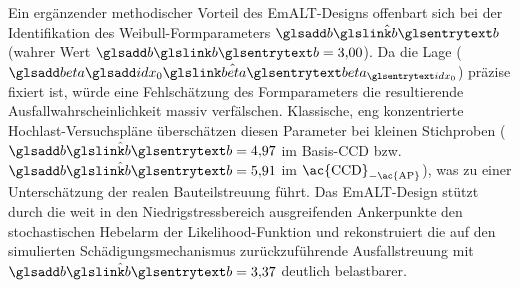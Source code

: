 Ein ergänzender methodischer Vorteil des \ac{EmALT}-Designs offenbart sich bei der Identifikation des Weibull-Formparameters $\hat{\sym{b}}$ (wahrer Wert $\sym{b} = 3{,}00$).
Da die Lage ($\hat{\symsub{beta}{idx_0}}$) präzise fixiert ist, würde eine Fehlschätzung des Formparameters die resultierende Ausfallwahrscheinlichkeit massiv verfälschen.
Klassische, eng konzentrierte Hochlast-Versuchspläne überschätzen diesen Parameter bei kleinen Stichproben ($\hat{\sym{b}} = 4{,}97$ im Basis-\ac{CCD} bzw. $\hat{\sym{b}} = 5{,}91$ im $\textnormal{\ac{CCD}}_{-\textnormal{\ac{AP}}}$), was zu einer Unterschätzung der realen Bauteilstreuung führt.
Das \ac{EmALT}-Design stützt durch die weit in den Niedrigstressbereich ausgreifenden Ankerpunkte den stochastischen Hebelarm der Likelihood-Funktion und rekonstruiert die auf den simulierten Schädigungsmechanismus zurückzuführende Ausfallstreuung mit $\hat{\sym{b}} = 3{,}37$ deutlich belastbarer.

